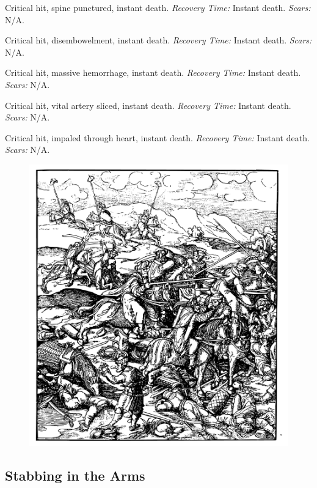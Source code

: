 \documentclass[12pt]{book}  %
\begin{document}
\begin{description}[labelwidth=1.5em, leftmargin=*, itemsep=0.4em]
    \item[16 -] Critical hit, spine punctured, instant death. \textit{Recovery Time:} Instant death. \textit{Scars:} N/A.
    \item[17 -] Critical hit, disembowelment, instant death. \textit{Recovery Time:} Instant death. \textit{Scars:} N/A.
    \item[18 -] Critical hit, massive hemorrhage, instant death. \textit{Recovery Time:} Instant death. \textit{Scars:} N/A.
    \item[19 -] Critical hit, vital artery sliced, instant death. \textit{Recovery Time:} Instant death. \textit{Scars:} N/A.
    \item[20 -] Critical hit, impaled through heart, instant death. \textit{Recovery Time:} Instant death. \textit{Scars:} N/A.
\end{description}

\begin{figure}[h]
    \centering
    \includegraphics[width=\textwidth]{./images/combat10.pdf}
\end{figure}

\subsection{Stabbing in the Arms}
\end{document}

